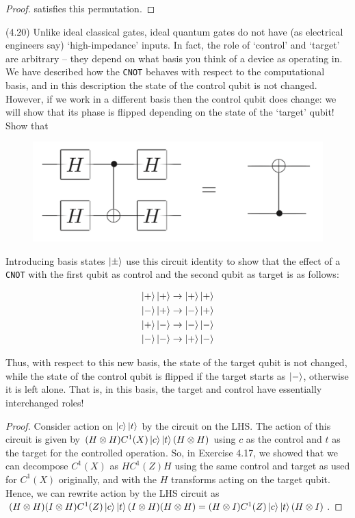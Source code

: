 \documentclass[main.tex]{subfiles}
\begin{document}
\begin{subappendices}
\begin{exercise}
\begin{proof}
satisfies this permutation. 
\end{proof}
\end{exercise}

\begin{exercise}(4.20) Unlike ideal classical gates, ideal quantum gates do not have (as electrical engineers say) ‘high-impedance’ inputs. In fact, the role of ‘control’ and ‘target’ are arbitrary – they depend on what basis you think of a device as operating in. We have described how the \texttt{CNOT} behaves with respect to the computational basis, and in this description the state of the control qubit is not changed. However, if we work in a different basis then the control qubit does change: we will show that its phase is flipped depending on the state of the ‘target’ qubit! Show that

\begin{figure}[H]
\centering
\includegraphics[width=.5\linewidth]{images/4_20.png}
\end{figure}

Introducing basis states $\ket{\pm}$ use this circuit identity to show that the effect of a \texttt{CNOT} with the first qubit as control and the second qubit as target is as follows:


\begin{align*}
\ket{+}\ket{+} \rightarrow \ket{+}\ket{+} \\	
\ket{-}\ket{+} \rightarrow \ket{-}\ket{+} \\	
\ket{+}\ket{-} \rightarrow \ket{-}\ket{-} \\	
\ket{-}\ket{-} \rightarrow \ket{+}\ket{-} 
\end{align*}

Thus, with respect to this new basis, the state of the target qubit is not changed, while the state of the control qubit is flipped if the target starts as $\ket{-}$, otherwise it is left alone. That is, in this basis, the target and control have essentially interchanged roles!

\begin{proof}
Consider action on $\ket{c}\ket{t}$ by the circuit on the LHS. The action of this circuit is given by $(H \otimes H) C^1(X)\ket{c}\ket{t} (H \otimes H)$ using $c$ as the control and $t$ as the target for the controlled operation. So, in Exercise 4.17, we showed that we can decompose $C^1(X)$ as $HC^1(Z)H$ using the same control and target as used for $C^1(X)$ originally, and with the $H$ transforms acting on the target qubit. Hence, we can rewrite action by the LHS circuit as $(H \otimes H) (I \otimes H) C^1(Z)\ket{c}\ket{t} (I \otimes H) (H \otimes H) = (H \otimes I) C^1(Z)\ket{c}\ket{t} (H \otimes I)$.


\end{proof}
\end{exercise}
\end{subappendices}
\end{document}
